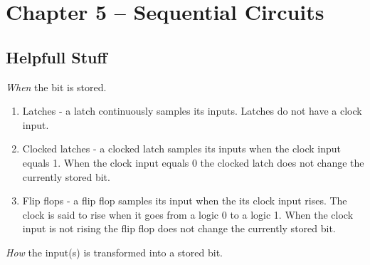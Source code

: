\section{Chapter 5 -- Sequential Circuits}

\subsection{Helpfull Stuff}

{\it When} the bit is stored.
\begin{enumerate}
	\item Latches - a latch continuously samples its inputs.  Latches do not have
	a clock input.
	\item Clocked latches - a clocked latch samples its inputs when the clock input equals 1.
	When the clock input equals 0 the clocked latch does not change the currently stored bit.
	\item Flip flops - a flip flop samples its input when the its clock input rises.  The
	clock is said to rise when it goes from a logic 0 to a logic 1.
	When the clock input is not rising the flip flop does not change the currently stored bit.
\end{enumerate}
{\it How} the input(s) is transformed into a stored bit.


